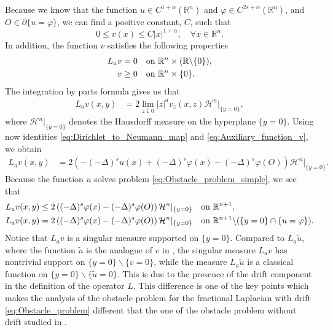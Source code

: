 \documentclass[11pt,reqno]{amsart}
\theoremstyle{definition}
\theoremstyle{remark}
\begin{document}
Because we know that the function $u \in C^{1+\alpha}({\mathbb{R}}^n)$ and $\varphi \in C^{2s+\alpha}({\mathbb{R}}^n)$, and $O\in\partial\{u=\varphi\}$, we can find a positive constant, $C$, such that
\begin{equation}
\label{eq:Ineq_v_on_R_n}
0\leq v(x) \leq C|x|^{1+\alpha},\quad\forall x\in{\mathbb{R}}^n.
\end{equation}
 In addition, the function $v$ satisfies the following properties
\begin{align}
\label{eq:Properties_v_1}
L_a v =0 &\quad\hbox{on }{\mathbb{R}}^n\times({\mathbb{R}}\backslash\{0\}),\\
\label{eq:Properties_v_2}
v \geq 0&\quad\hbox{on }{\mathbb{R}}^n\times\{0\}.
\end{align}
The integration by parts formula gives us that
\begin{align*}
L_a v(x,y) &= 2 \lim_{z\downarrow 0} |z|^a v_z(x,z) {{\mathcal{H}}}^n|_{\{y=0\}},
\end{align*}
where ${{\mathcal{H}}}^n|_{\{y=0\}}$ denotes the Hausdorff measure on the hyperplane $\{y=0\}$. Using now identities \eqref{eq:Dirichlet_to_Neumann_map} and \eqref{eq:Auxiliary_function_v}, we obtain
\begin{align}
\label{eq:Equation_v}
L_a v(x,y) &= 2\left(-(-\Delta)^s u(x) +(-\Delta)^s \varphi(x)-(-\Delta)^s \varphi(O)\right){{\mathcal{H}}}^n|_{\{y=0\}}.
\end{align}
Because the function $u$ solves problem \eqref{eq:Obstacle_problem_simple}, we see that
\begin{align}
\label{eq:Upper_bound_L_a}
L_a v(x,y) &\leq 2\left((-\Delta)^s \varphi(x)-(-\Delta)^s \varphi(O)\right){{\mathcal{H}}}^n|_{\{y=0\}}\quad\hbox{on } {\mathbb{R}}^{n+1},\\
\label{eq:Equality_L_a}
L_a v(x,y) &= 2\left((-\Delta)^s \varphi(x)-(-\Delta)^s \varphi(O)\right){{\mathcal{H}}}^n|_{\{y=0\}}\quad\hbox{on } {\mathbb{R}}^{n+1}\backslash(\{y=0\}\cap\{u=\varphi\}).
\end{align}
Notice that $L_a v$ is a singular measure supported on $\{y=0\}$. Compared to $L_a \widetilde u$, where the function $\widetilde u$ is the analogue of $v$ in \cite[p. 433]{Caffarelli_Silvestre_2007}, the singular measure $L_a v$ has nontrivial support on $\{y=0\}\backslash\{v=0\}$, while the measure $L_a\widetilde u$ is a classical function on $\{y=0\}\backslash\{\widetilde u=0\}$. This is due to the presence of the drift component in the definition of the operator $L$. This difference is one of the key points which makes the analysis of the obstacle problem for the fractional Laplacian with drift \eqref{eq:Obstacle_problem} different that the one of the obstacle problem without drift studied in \cite{Caffarelli_Salsa_Silvestre_2008}.
\end{document}
